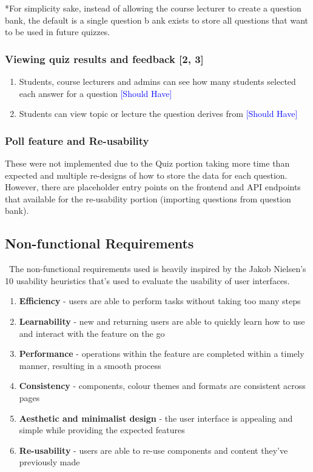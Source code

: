 *For simplicity sake, instead of allowing the course lecturer to create a question bank, the default is a single question b ank exists to store all questions that want to be used in future quizzes. 

\subsubsection{Viewing quiz results and feedback [2, 3]}
\begin{enumerate}
	\item Students, course lecturers and admins can see how many students selected each answer for a question \textcolor{Blue}{[Should Have]}
	\item Students can view topic or lecture the question derives from \textcolor{Blue}{[Should Have]}
\end{enumerate}

\subsubsection{Poll feature and Re-usability}
These were not implemented due to the Quiz portion taking more time than expected and multiple re-designs of how to store the data for each question. However, there are placeholder entry points on the frontend and API endpoints that available for the re-usability portion (importing questions from question bank).


\subsection{Non-functional Requirements}\
The non-functional requirements used is heavily inspired by the Jakob Nielsen's 10 usability heuristics that's used to evaluate the usability of user interfaces. 

\begin{enumerate}
	\item \textbf{Efficiency} - users are able to perform tasks without taking too many steps
	\item \textbf{Learnability} - new and returning users are able to quickly learn how to use and interact with the feature on the go
	\item \textbf{Performance} - operations within the feature are completed within a timely manner, resulting in a smooth process
	\item \textbf{Consistency} - components, colour themes and formats are consistent across pages 
	\item \textbf{Aesthetic and minimalist design} - the user interface is appealing and simple while providing the expected features
	\item \textbf{Re-usability} - users are able to re-use components and content they've previously made
\end{enumerate}

